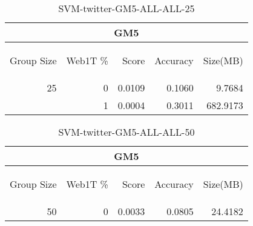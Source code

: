 \begin{center}
\begin{table}[htbp] 
 \begin{center}
\begin{tabular}{ | r | r | r | r | r |}
\hline
\multicolumn{5}{|c|}{GM5}\\
\hline
\begin{sideways}Group Size\end{sideways} & \begin{sideways}Web1T \%\end{sideways} & \begin{sideways}Score\end{sideways} & \begin{sideways}Accuracy\end{sideways} & \begin{sideways}Size(MB)\end{sideways}\\
\hline
\multirow{1}{*}{25}
 & 0 & 0.0109 & 0.1060 & 9.7684\\ \cline{2-5}
 & 1 & 0.0004 & 0.3011 & 682.9173\\ \cline{2-5}
\hline
\end{tabular}
\caption{SVM-twitter-GM5-ALL-ALL-25}
\label{table:SVM-twitter-GM5-ALL-ALL-25}
\end{center}
 \end{table}
\end{center}

\begin{center}
\begin{table}[htbp] 
 \begin{center}
\begin{tabular}{ | r | r | r | r | r |}
\hline
\multicolumn{5}{|c|}{GM5}\\
\hline
\begin{sideways}Group Size\end{sideways} & \begin{sideways}Web1T \%\end{sideways} & \begin{sideways}Score\end{sideways} & \begin{sideways}Accuracy\end{sideways} & \begin{sideways}Size(MB)\end{sideways}\\
\hline
\multirow{0}{*}{50}
 & 0 & 0.0033 & 0.0805 & 24.4182\\ \cline{2-5}
\hline
\end{tabular}
\caption{SVM-twitter-GM5-ALL-ALL-50}
\label{table:SVM-twitter-GM5-ALL-ALL-50}
\end{center}
 \end{table}
\end{center}

